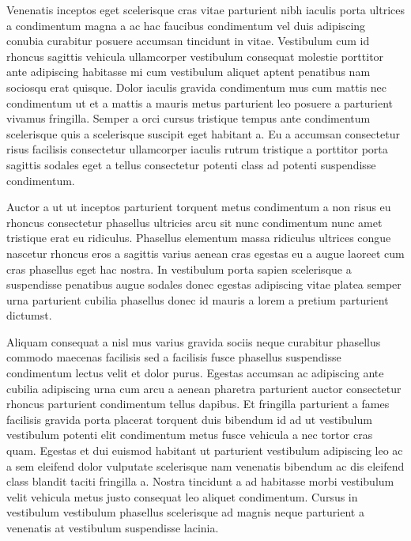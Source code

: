 \par
Venenatis inceptos eget scelerisque cras vitae parturient nibh iaculis porta ultrices a condimentum magna a ac hac faucibus condimentum vel duis adipiscing conubia curabitur posuere accumsan tincidunt in vitae. Vestibulum cum id rhoncus sagittis vehicula ullamcorper vestibulum consequat molestie porttitor ante adipiscing habitasse mi cum vestibulum aliquet aptent penatibus nam sociosqu erat quisque. Dolor iaculis gravida condimentum mus cum mattis nec condimentum ut et a mattis a mauris metus parturient leo posuere a parturient vivamus fringilla. Semper a orci cursus tristique tempus ante condimentum scelerisque quis a scelerisque suscipit eget habitant a. Eu a accumsan consectetur risus facilisis consectetur ullamcorper iaculis rutrum tristique a porttitor porta sagittis sodales eget a tellus consectetur potenti class ad potenti suspendisse condimentum.
\par
Auctor a ut ut inceptos parturient torquent metus condimentum a non risus eu rhoncus consectetur phasellus ultricies arcu sit nunc condimentum nunc amet tristique erat eu ridiculus. Phasellus elementum massa ridiculus ultrices congue nascetur rhoncus eros a sagittis varius aenean cras egestas eu a augue laoreet cum cras phasellus eget hac nostra. In vestibulum porta sapien scelerisque a suspendisse penatibus augue sodales donec egestas adipiscing vitae platea semper urna parturient cubilia phasellus donec id mauris a lorem a pretium parturient dictumst.
\par
Aliquam consequat a nisl mus varius gravida sociis neque curabitur phasellus commodo maecenas facilisis sed a facilisis fusce phasellus suspendisse condimentum lectus velit et dolor purus. Egestas accumsan ac adipiscing ante cubilia adipiscing urna cum arcu a aenean pharetra parturient auctor consectetur rhoncus parturient condimentum tellus dapibus. Et fringilla parturient a fames facilisis gravida porta placerat torquent duis bibendum id ad ut vestibulum vestibulum potenti elit condimentum metus fusce vehicula a nec tortor cras quam. Egestas et dui euismod habitant ut parturient vestibulum adipiscing leo ac a sem eleifend dolor vulputate scelerisque nam venenatis bibendum ac dis eleifend class blandit taciti fringilla a. Nostra tincidunt a ad habitasse morbi vestibulum velit vehicula metus justo consequat leo aliquet condimentum. Cursus in vestibulum vestibulum phasellus scelerisque ad magnis neque parturient a venenatis at vestibulum suspendisse lacinia. 
\par
